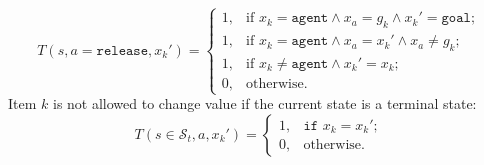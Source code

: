 \begin{equation}\label{eq:Txkrelease}
    T(s,a=\texttt{release}, x_k') = \begin{cases}
             1, & \text{if }x_k =\texttt{agent} \land x_a = g_k \land x_k' = \texttt{goal}; \\
             1, & \text{if }x_k =\texttt{agent} \land x_a = x_k' \land x_a \neq g_k; \\
             1, & \text{if }x_k\neq \texttt{agent} \land x_k'=x_k; \\
             0, & \text{otherwise}. 
             \end{cases}
\end{equation}
Item $k$ is not allowed to change value if the current state is a terminal state:
\begin{equation}\label{eq:Txkts}
    T(s\in\mathcal{S}_t, a, x_k') = \begin{cases}1, &\texttt{if }x_k=x_k';\\
         0,& \text{otherwise}.\end{cases}
\end{equation}
